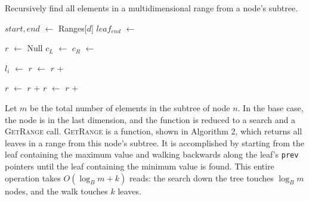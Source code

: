 \documentclass[11pt, oneside]{article}
\newcommand*\Let[2]{\State #1 $\gets$ #2}
\newcommand{\ms}{\texttt}
\begin{document}
\begin{algorithm}[H]
    \caption{Recursively find all elements in a multidimensional range from a
        node's subtree.}
    \begin{algorithmic}[1]
        \Statex
            \Let{$start, end$}{Ranges[$d$]}
                \Let{$leaf_{end}$}{}
                \State \Return{}
            \EndIf
            
            \State
            \Let{$r$}{Null}
            \Let{$c_L$}{}
            \Let{$c_R$}{}
            \State {}
            \State

                \State {}
                \Let{$l_i$}{}
                \Let{$r$}{$r$ + }
            \EndFor

            \State
            \State {}
            
            \Let{$r$}{$r$ + }
            \Let{$r$}{$r$ + }

            \State {}
        \EndFunction
        \end{algorithmic}
\end{algorithm}

Let $m$ be the total number of elements in the subtree of node $n$. In the base
case, the node is in the last dimension, and the function is reduced to a search
and a \textsc{GetRange} call. \textsc{GetRange} is a function, shown in
Algorithm 2, which returns all leaves in a range from this node's subtree. It is
accomplished by starting from the leaf containing the maximum value and walking
backwards along the leaf's \ms{prev} pointers until the leaf containing the
minimum value is found. This entire operation takes $O(\log_B m + k)$ reads: the
search down the tree touches $\log_B m$ nodes, and the walk touches $k$ leaves.
\end{document}
